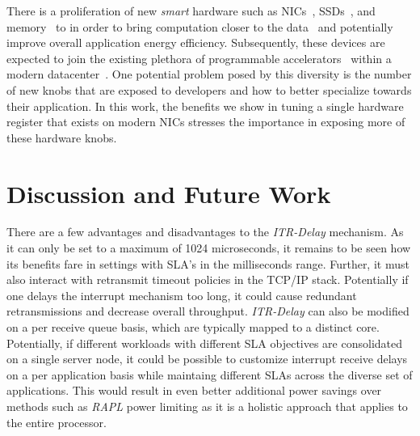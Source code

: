 \documentclass[letterpaper,twocolumn,10pt]{article}
\begin{document}
There is a proliferation of new \textit{smart} hardware such as NICs~\cite{netronome, mellanoxsnic}, SSDs~\cite{biscuit}, and memory~\cite{dpu} to in order to bring computation closer to the data~\cite{neardataprocess, ndp1} and potentially improve overall application energy efficiency. Subsequently, these devices are expected to join the existing plethora of programmable accelerators~\cite{msrfpga, tpu} within a modern datacenter~\cite{silberstein1}. One potential problem posed by this diversity is the number of new knobs that are exposed to developers and how to better specialize towards their application. In this work, the benefits we show in tuning a single hardware register that exists on modern NICs stresses the importance in exposing more of these hardware knobs.

\section{Discussion and Future Work}
There are a few advantages and disadvantages to the \textit{ITR-Delay} mechanism. As it can only be set to a maximum of 1024 microseconds, it remains to be seen how its benefits fare in settings with SLA's in the milliseconds range. Further, it must also interact with retransmit timeout policies in the TCP/IP stack. Potentially if one delays the interrupt mechanism too long, it could cause redundant retransmissions and decrease overall throughput. \textit{ITR-Delay} can also be modified on a per receive queue basis, which are typically mapped to a distinct core. Potentially, if different workloads with different SLA objectives are consolidated on a single server node, it could be possible to customize interrupt receive delays on a per application basis while maintaing different SLAs across the diverse set of applications. This would result in even better additional power savings over methods such as \textit{RAPL} power limiting as it is a holistic approach that applies to the entire processor.
\end{document}
